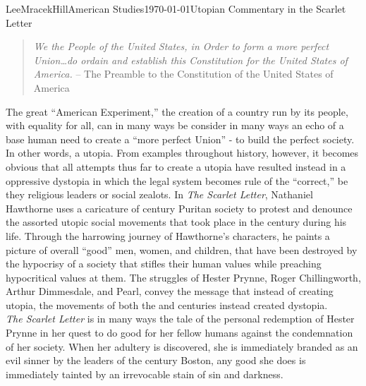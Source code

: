 \documentclass[12pt, letterpaper]{article}
\begin{document}
\begin{mla}{Lee}{Mracek}{Hill}{American Studies}{\today}{Utopian Commentary in the Scarlet Letter}
\doublespacing
\begin{quotation}
\textit{We the People of the United States, in Order to form a more perfect Union\ldots do ordain and establish this Constitution for the United States of America.} -- The Preamble to the Constitution of the United States of America
\end{quotation}
The great ``American Experiment,'' the creation of a country run by its people, with equality for all, can in many ways be consider in many ways an echo of a base human need to create a ``more perfect Union'' - to build the perfect society. In other words, a utopia. From examples throughout history, however, it becomes obvious that all attempts thus far to create a utopia have resulted instead in a oppressive dystopia in which the legal system becomes rule of the ``correct,'' be they religious leaders or social zealots. In \textit{The Scarlet Letter}, Nathaniel Hawthorne uses a caricature of  century Puritan society to protest and denounce the assorted utopic social movements that took place in the  century during his life. Through the harrowing journey of Hawthorne's characters, he paints a picture of overall ``good'' men, women, and children, that have been destroyed by the hypocrisy of a society that stifles their human values while preaching hypocritical values at them. The struggles of Hester Prynne, Roger Chillingworth, Arthur Dimmesdale, and Pearl, convey the message that instead of creating utopia, the movements of both the  and  centuries instead created dystopia. \\
\textit{The Scarlet Letter} is in many ways the tale of the personal redemption of Hester Prynne in her quest to do good for her fellow humans against the condemnation of her society. When her adultery is discovered, she is immediately branded as an evil sinner by the leaders of the  century Boston, any good she does is immediately tainted by an irrevocable stain of sin and darkness.\\

\end{mla}
\end{document}
